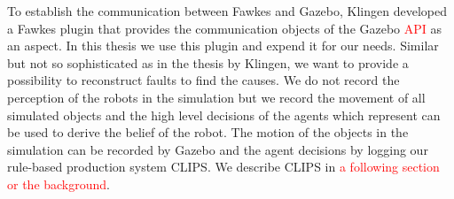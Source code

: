 To establish the communication between Fawkes and Gazebo, Klingen developed a Fawkes plugin that provides the communication objects of the Gazebo \textcolor{red}{API} as an aspect. In this thesis we use this plugin and expend it for our needs. Similar but not so sophisticated as in the thesis by Klingen, we want to provide a possibility to reconstruct faults to find the causes. We do not record the perception of the robots in the simulation but we record the movement of all simulated objects and the high level decisions of the agents which represent can be used to derive the belief of the robot. The motion of the objects in the simulation can be recorded by Gazebo and the agent decisions by logging our rule-based production system CLIPS. We describe CLIPS in \textcolor{red}{a following section or the background}.


